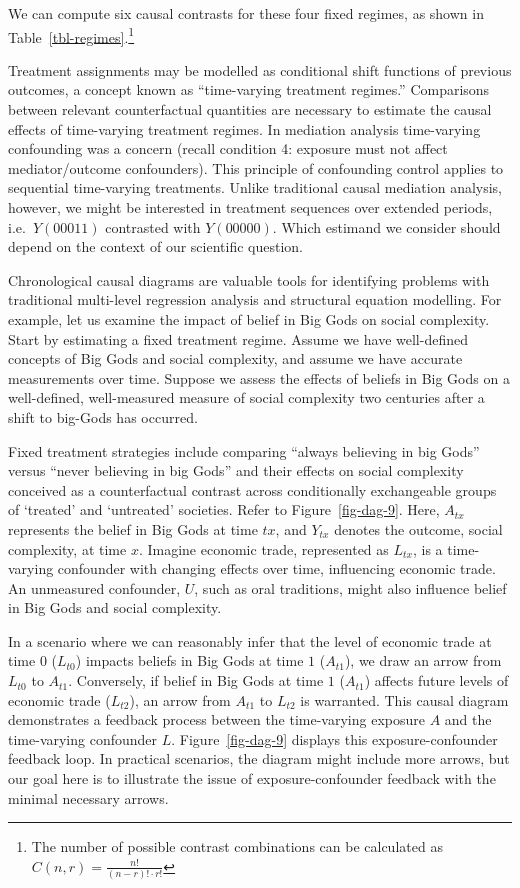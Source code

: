 \documentclass[
  singlecolumn,
  9pt]{article}
\begin{document}
We can compute six causal contrasts for these four fixed regimes, as
shown in Table~\ref{tbl-regimes}.\footnote{The number of possible
  contrast combinations can be calculated as
  \(C(n, r) = \frac{n!}{(n-r)! \cdot r!}\)}

Treatment assignments may be modelled as conditional shift functions of
previous outcomes, a concept known as ``time-varying treatment
regimes.'' Comparisons between relevant counterfactual quantities are
necessary to estimate the causal effects of time-varying treatment
regimes. In mediation analysis time-varying confounding was a concern
(recall condition 4: exposure must not affect mediator/outcome
confounders). This principle of confounding control applies to
sequential time-varying treatments. Unlike traditional causal mediation
analysis, however, we might be interested in treatment sequences over
extended periods, i.e.~\(Y(00011)\) contrasted with \(Y(00000)\). Which
estimand we consider should depend on the context of our scientific
question.

Chronological causal diagrams are valuable tools for identifying
problems with traditional multi-level regression analysis and structural
equation modelling. For example, let us examine the impact of belief in
Big Gods on social complexity. Start by estimating a fixed treatment
regime. Assume we have well-defined concepts of Big Gods and social
complexity, and assume we have accurate measurements over time. Suppose
we assess the effects of beliefs in Big Gods on a well-defined,
well-measured measure of social complexity two centuries after a shift
to big-Gods has occurred.

Fixed treatment strategies include comparing ``always believing in big
Gods'' versus ``never believing in big Gods'' and their effects on
social complexity conceived as a counterfactual contrast across
conditionally exchangeable groups of `treated' and `untreated'
societies. Refer to Figure~\ref{fig-dag-9}. Here, \(A_{tx}\) represents
the belief in Big Gods at time \(tx\), and \(Y_{tx}\) denotes the
outcome, social complexity, at time \(x\). Imagine economic trade,
represented as \(L_{tx}\), is a time-varying confounder with changing
effects over time, influencing economic trade. An unmeasured confounder,
\(U\), such as oral traditions, might also influence belief in Big Gods
and social complexity.

In a scenario where we can reasonably infer that the level of economic
trade at time \(0\) (\(L_{t0}\)) impacts beliefs in Big Gods at time
\(1\) (\(A_{t1}\)), we draw an arrow from \(L_{t0}\) to \(A_{t1}\).
Conversely, if belief in Big Gods at time \(1\) (\(A_{t1}\)) affects
future levels of economic trade (\(L_{t2}\)), an arrow from \(A_{t1}\)
to \(L_{t2}\) is warranted. This causal diagram demonstrates a feedback
process between the time-varying exposure \(A\) and the time-varying
confounder \(L\). Figure~\ref{fig-dag-9} displays this
exposure-confounder feedback loop. In practical scenarios, the diagram
might include more arrows, but our goal here is to illustrate the issue
of exposure-confounder feedback with the minimal necessary arrows.
\end{document}
